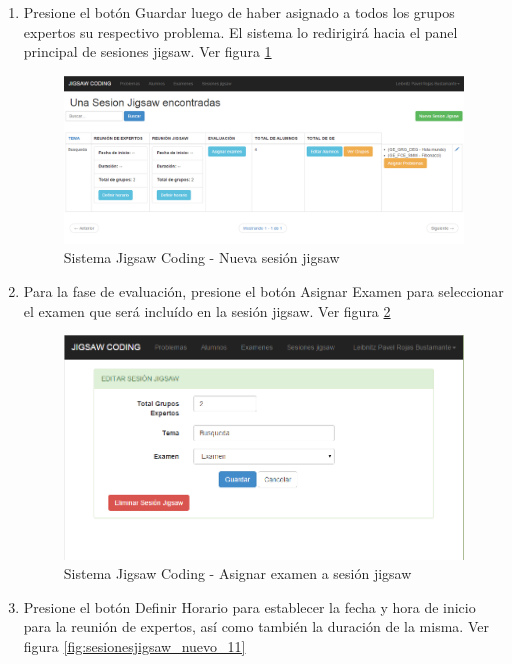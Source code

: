 \begin{enumerate}
\begin{figure}[h!]
	\end{figure}
	\item Presione el botón Guardar luego de haber asignado a todos los grupos expertos su respectivo problema. El sistema lo redirigirá hacia el panel principal de sesiones jigsaw. Ver figura \ref{fig:sesionesjigsaw_nuevo_08}
	\begin{figure}[h!]
		\centering
		\caption[SJC Sesiones Jigsaw]{Sistema Jigsaw Coding - Nueva sesión jigsaw}
		\label{fig:sesionesjigsaw_nuevo_08}
		\includegraphics[scale=0.4]{figuras/usodelsistema/docente/sesionesjigsaw_nuevo_08}
	\end{figure}
	\item Para la fase de evaluación, presione el botón Asignar Examen para seleccionar el examen que será incluído en la sesión jigsaw. Ver figura \ref{fig:sesionesjigsaw_nuevo_09}
	\begin{figure}[h!]
		\centering
		\caption[SJC Sesiones Jigsaw]{Sistema Jigsaw Coding - Asignar examen a sesión jigsaw}
		\label{fig:sesionesjigsaw_nuevo_09}
		\includegraphics[scale=0.5]{figuras/usodelsistema/docente/sesionesjigsaw_nuevo_09}
	\end{figure}
	\item Presione el botón Definir Horario para establecer la fecha y hora de inicio para la reunión de expertos, así como también la duración de la misma. Ver figura \ref{fig:sesionesjigsaw_nuevo_11}

\end{enumerate}
